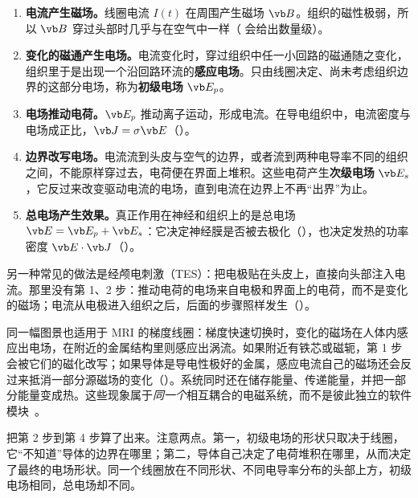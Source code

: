 \begin{enumerate}
\item \textbf{电流产生磁场。}线圈电流 $I(t)$ 在周围产生磁场 $\vb B$。组织的磁性极弱，所以 $\vb B$ 穿过头部时几乎与在空气中一样（ 会给出数量级）。
\item \textbf{变化的磁通产生电场。}电流变化时，穿过组织中任一小回路的磁通随之变化，组织里于是出现一个沿回路环流的\textbf{感应电场}。只由线圈决定、尚未考虑组织边界的这部分电场，称为\textbf{初级电场} $\vb E_p$。
\item \textbf{电场推动电荷。}$\vb E_p$ 推动离子运动，形成电流。在导电组织中，电流密度与电场成正比，$\vb J=\sigma\vb E$（）。
\item \textbf{边界改写电场。}电流流到头皮与空气的边界，或者流到两种电导率不同的组织之间，不能原样穿过去，电荷便在界面上堆积。这些电荷产生\textbf{次级电场} $\vb E_s$，它反过来改变驱动电流的电场，直到电流在边界上不再“出界”为止。
\item \textbf{总电场产生效果。}真正作用在神经和组织上的是总电场 $\vb E=\vb E_p+\vb E_s$：它决定神经膜是否被去极化（），也决定发热的功率密度 $\vb E\cdot\vb J$（）。
\end{enumerate}

另一种常见的做法是经颅电刺激（TES）：把电极贴在头皮上，直接向头部注入电流。那里没有第 1、2 步：推动电荷的电场来自电极和界面上的电荷，而不是变化的磁场；电流从电极进入组织之后，后面的步骤照样发生（）。

同一幅图景也适用于 MRI 的梯度线圈：梯度快速切换时，变化的磁场在人体内感应出电场，在附近的金属结构里则感应出涡流。如果附近有铁芯或磁轭，第 1 步会被它们的磁化改写；如果导体是导电性极好的金属，感应电流自己的磁场还会反过来抵消一部分源磁场的变化（）。系统同时还在储存能量、传递能量，并把一部分能量变成热。这些现象属于\emph{同一个}相互耦合的电磁系统，而不是彼此独立的软件模块~\cite{haus}。


 把第 2 步到第 4 步算了出来。注意两点。第一，初级电场的形状只取决于线圈，它“不知道”导体的边界在哪里；第二，导体自己决定了电荷堆积在哪里，从而决定了最终的电场形状。同一个线圈放在不同形状、不同电导率分布的头部上方，初级电场相同，总电场却不同。

